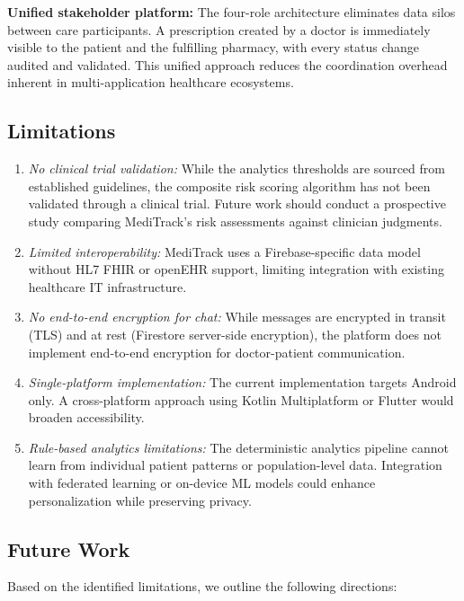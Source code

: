 \documentclass[journal,onecolumn,web]{ieeecolor}
\begin{document}
{\bf Unified stakeholder platform:} The four-role
architecture eliminates data silos between care
participants. A prescription created by a doctor is
immediately visible to the patient and the fulfilling
pharmacy, with every status change audited and
validated. This unified approach reduces the
coordination overhead inherent in multi-application
healthcare ecosystems.

\subsection{Limitations}
\begin{enumerate}
\item {\it No clinical trial validation:} While the
analytics thresholds are sourced from established
guidelines, the composite risk scoring algorithm has
not been validated through a clinical trial. Future
work should conduct a prospective study comparing
MediTrack's risk assessments against clinician
judgments.

\item {\it Limited interoperability:} MediTrack uses
a Firebase-specific data model without HL7 FHIR or
openEHR support, limiting integration with existing
healthcare IT infrastructure.

\item {\it No end-to-end encryption for chat:} While
messages are encrypted in transit (TLS) and at rest
(Firestore server-side encryption), the platform
does not implement end-to-end encryption for
doctor-patient communication.

\item {\it Single-platform implementation:} The
current implementation targets Android only. A
cross-platform approach using Kotlin Multiplatform
or Flutter would broaden accessibility.

\item {\it Rule-based analytics limitations:} The
deterministic analytics pipeline cannot learn from
individual patient patterns or population-level
data. Integration with federated learning or
on-device ML models could enhance personalization
while preserving privacy.
\end{enumerate}

\subsection{Future Work}
Based on the identified limitations, we outline the
following directions:
\end{document}
